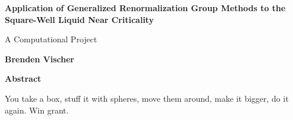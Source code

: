 \thispagestyle{plain}
\begin{center}
    \Large
    \textbf{Application of Generalized Renormalization Group Methods to the Square-Well Liquid Near Criticality}
   
    \vspace{0.8cm}
    \large
    A Computational Project
    
    \vspace{0.8cm}
    \textbf{Brenden Vischer}
    
    \vspace{1.2cm}
    \textbf{Abstract}
\end{center}

You take a box, stuff it with spheres, move them around, make it bigger, do it again. Win grant.
\clearpage